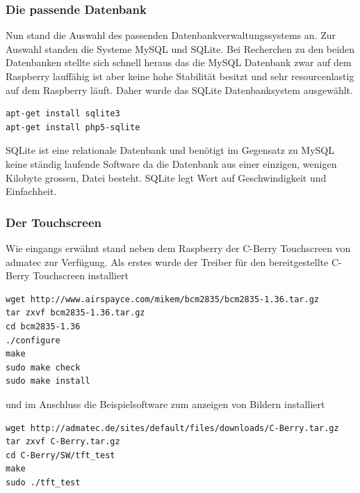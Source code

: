 \documentclass[11pt,a4paper]{article} %
\begin{document}
\subsubsection{Die passende Datenbank}
Nun stand die Auswahl des passenden Datenbankverwaltungssystems an. Zur Auswahl standen die Systeme MySQL und SQLite. Bei Recherchen zu den beiden Datenbanken stellte sich schnell heraus das die MySQL Datenbank zwar auf dem Raspberry lauffähig ist aber keine hohe Stabilität besitzt und sehr resourcenlastig auf dem Raspberry läuft. Daher wurde das SQLite Datenbanksystem ausgewählt.
\begin{frame}

\begin{lstlisting}
apt-get install sqlite3
apt-get install php5-sqlite
\end{lstlisting}

\end{frame}
 SQLite ist eine relationale Datenbank und benötigt im Gegensatz zu MySQL keine ständig laufende Software da die Datenbank aus einer einzigen, wenigen Kilobyte grossen, Datei besteht. SQLite  legt Wert auf Geschwindigkeit und Einfachheit.
\par
\subsubsection{Der Touchscreen}
Wie eingangs erwähnt stand neben dem Raspberry der C-Berry Touchscreen von admatec zur Verfügung. \cite{10}
Als erstes wurde der Treiber für den bereitgestellte C-Berry Touchscreen installiert \cite{5}
\begin{frame}

\begin{lstlisting}
wget http://www.airspayce.com/mikem/bcm2835/bcm2835-1.36.tar.gz
tar zxvf bcm2835-1.36.tar.gz
cd bcm2835-1.36
./configure
make
sudo make check
sudo make install
\end{lstlisting}

\end{frame}
und im Anschluss die Beispielsoftware zum anzeigen von Bildern installiert
\begin{frame}

\begin{lstlisting}
wget http://admatec.de/sites/default/files/downloads/C-Berry.tar.gz
tar zxvf C-Berry.tar.gz
cd C-Berry/SW/tft_test
make
sudo ./tft_test
\end{lstlisting}

\end{frame}
\end{document}
